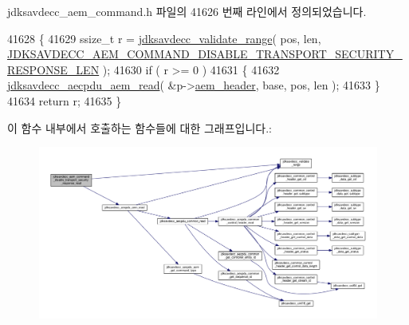 jdksavdecc\+\_\+aem\+\_\+command.\+h 파일의 41626 번째 라인에서 정의되었습니다.


\begin{DoxyCode}
41628 \{
41629     ssize\_t r = \hyperlink{group__util_ga9c02bdfe76c69163647c3196db7a73a1}{jdksavdecc\_validate\_range}( pos, len, 
      \hyperlink{group__command__disable__transport__security__response_gaa2a1ce5fdb725aaac5f7a4c2892aa70a}{JDKSAVDECC\_AEM\_COMMAND\_DISABLE\_TRANSPORT\_SECURITY\_RESPONSE\_LEN}
       );
41630     \textcolor{keywordflow}{if} ( r >= 0 )
41631     \{
41632         \hyperlink{group__aecpdu__aem_gae2421015dcdce745b4f03832e12b4fb6}{jdksavdecc\_aecpdu\_aem\_read}( &p->\hyperlink{structjdksavdecc__aem__command__disable__transport__security__response_ae1e77ccb75ff5021ad923221eab38294}{aem\_header}, base, pos, len );
41633     \}
41634     \textcolor{keywordflow}{return} r;
41635 \}
\end{DoxyCode}


이 함수 내부에서 호출하는 함수들에 대한 그래프입니다.\+:
\nopagebreak
\begin{figure}[H]
\begin{center}
\leavevmode
\includegraphics[width=350pt]{group__command__disable__transport__security__response_ga967eb99d0c1982bd2f241d554282959f_cgraph}
\end{center}
\end{figure}


